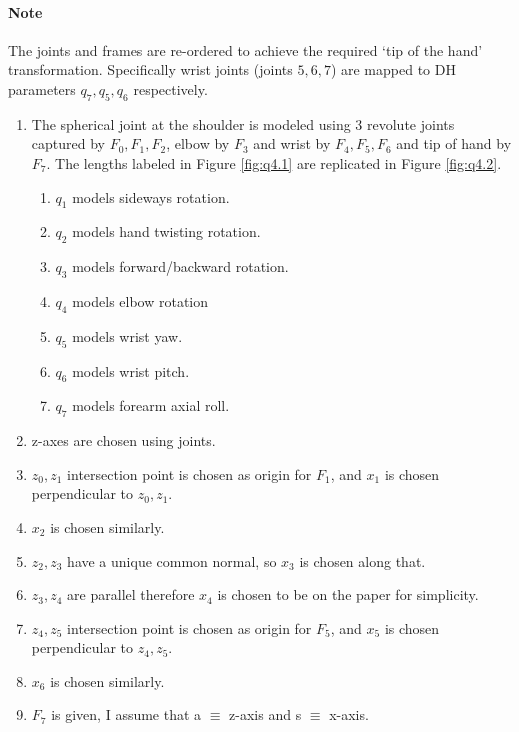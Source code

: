 \documentclass[12pt]{article}
\begin{document}
\paragraph{Note} The joints and frames are re-ordered to achieve the required `tip of the hand' transformation. Specifically wrist joints (joints $5, 6, 7$) are mapped to DH parameters $q_7, q_5, q_6$ respectively.
\begin{enumerate}[nolistsep]
  \item The spherical joint at the shoulder is modeled using 3 revolute joints captured by $F_0, F_1, F_2$, elbow by $F_3$ and wrist by $F_4, F_5, F_6$ and tip of hand by $F_7$. The lengths labeled in Figure \ref{fig:q4.1} are replicated in Figure \ref{fig:q4.2}.
    \begin{enumerate}[nolistsep]
      \item $q_1$ models sideways rotation.
      \item $q_2$ models hand twisting rotation.
      \item $q_3$ models forward/backward rotation.
      \item $q_4$ models elbow rotation
      \item $q_5$ models wrist yaw.
      \item $q_6$ models wrist pitch.
      \item $q_7$ models forearm axial roll.
    \end{enumerate}
  \item z-axes are chosen using joints.
  \item $z_0, z_1$ intersection point is chosen as origin for $F_1$, and $x_1$ is chosen perpendicular to $z_0, z_1$.
  \item $x_2$ is chosen similarly.
  \item $z_2, z_3$ have a unique common normal, so $x_3$ is chosen along that.
  \item $z_3, z_4$ are parallel therefore $x_4$ is chosen to be on the paper for simplicity.
  \item $z_4, z_5$ intersection point is chosen as origin for $F_5$, and $x_5$ is chosen perpendicular to $z_4, z_5$.
  \item $x_6$ is chosen similarly.
  \item $F_7$ is given, I assume that a $\equiv$ z-axis and s $\equiv$ x-axis.
\end{enumerate}
\end{document}
